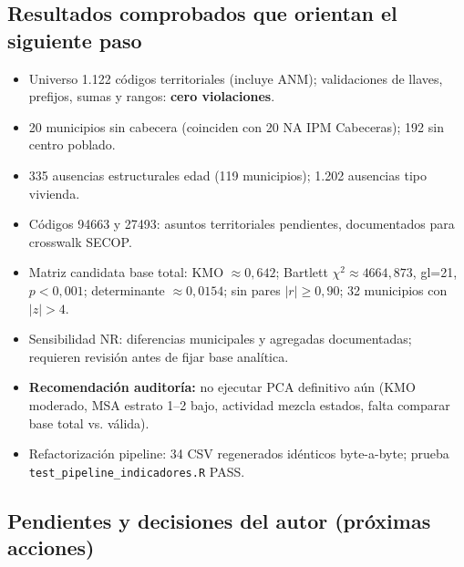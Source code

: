 \subsection{Resultados comprobados que orientan el siguiente paso}
\label{sec:resultados_comprobados}

\begin{itemize}
    \item Universo 1.122 códigos territoriales (incluye ANM); validaciones de llaves, prefijos, sumas y rangos: \textbf{cero violaciones}.
    \item 20 municipios sin cabecera (coinciden con 20 NA IPM Cabeceras); 192 sin centro poblado.
    \item 335 ausencias estructurales edad (119 municipios); 1.202 ausencias tipo vivienda.
    \item Códigos 94663 y 27493: asuntos territoriales pendientes, documentados para crosswalk SECOP.
    \item Matriz candidata base total: KMO $\approx 0,642$; Bartlett $\chi^2\approx 4664,873$, gl=21, $p<0,001$; determinante $\approx 0,0154$; sin pares $|r|\ge0,90$; 32 municipios con $|z|>4$.
    \item Sensibilidad NR: diferencias municipales y agregadas documentadas; requieren revisión antes de fijar base analítica.
    \item \textbf{Recomendación auditoría:} no ejecutar PCA definitivo aún (KMO moderado, MSA estrato 1--2 bajo, actividad mezcla estados, falta comparar base total vs. válida).
    \item Refactorización pipeline: 34 CSV regenerados idénticos byte-a-byte; prueba \texttt{test\_pipeline\_indicadores.R} PASS.
\end{itemize}

\subsection{Pendientes y decisiones del autor (próximas acciones)}
\label{sec:pendientes_acciones}

